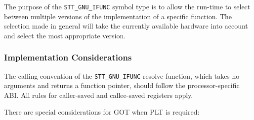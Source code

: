 The purpose of the \texttt{STT_GNU_IFUNC} symbol type is to allow the
run-time to select between multiple versions of the implementation of
a specific function.  The selection made in general will take the
currently available hardware into account and select the most
appropriate version.

\subsubsection{Implementation Considerations}

The calling convention of the \texttt{STT_GNU_IFUNC} resolve
function, which takes no arguments and returns a function pointer,
should follow the processor-specific ABI. All rules for caller-saved
and callee-saved registers apply.

There are special considerations for GOT when PLT is required:

